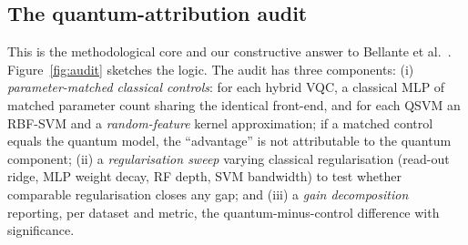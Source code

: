 \documentclass[preprint,11pt]{elsarticle}
\begin{document}
\subsection{The quantum-attribution audit}\label{sec:audit}
This is the methodological core and our constructive answer to Bellante et al.~\cite{bellante2025pca}.
Figure~\ref{fig:audit} sketches the logic. The audit has three components: (i) \emph{parameter-matched
classical controls}: for each hybrid VQC, a classical MLP of matched parameter count sharing the
identical front-end, and for each QSVM an RBF-SVM and a \emph{random-feature} kernel approximation; if a
matched control equals the quantum model, the ``advantage'' is not attributable to the quantum component;
(ii) a \emph{regularisation sweep} varying classical regularisation (read-out ridge, MLP weight decay,
RF depth, SVM bandwidth) to test whether comparable regularisation closes any gap; and (iii) a \emph{gain
decomposition} reporting, per dataset and metric, the quantum-minus-control difference with significance.
\end{document}
